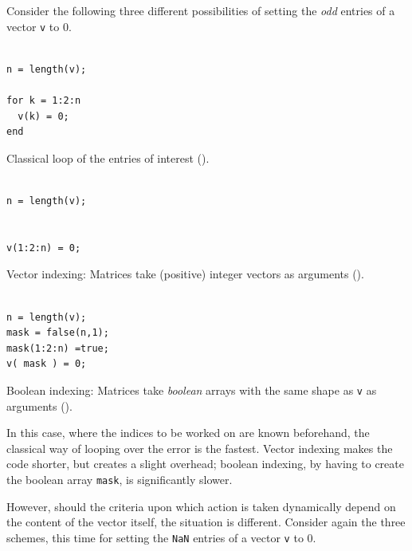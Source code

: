 Consider the following three different possibilities of setting the \emph{odd}
entries of a vector \lstinline!v! to $0$.

\hfill
\begin{minipage}[t]{.29\textwidth}
\begin{lstlisting}[framerule=1pt,rulecolor=\color{goodgreen}]
% [...] create v

n = length(v);

for k = 1:2:n
  v(k) = 0;
end
\end{lstlisting}
Classical loop of the entries of interest ().
\end{minipage}
\hfill
\begin{minipage}[t]{.29\textwidth}
\begin{lstlisting}[framerule=1pt,rulecolor=\color{mediocre}]
% [...] create v

n = length(v);


v(1:2:n) = 0;

\end{lstlisting}
Vector indexing: Matrices take (positive) integer vectors as arguments
().
\end{minipage}
\hfill
\begin{minipage}[t]{.29\textwidth}
\begin{lstlisting}[framerule=1pt,rulecolor=\color{badred}]
% [...] create v

n = length(v);
mask = false(n,1);
mask(1:2:n) =true;
v( mask ) = 0;

\end{lstlisting}
Boolean indexing: Matrices take \emph{boolean} arrays\footnotemark{} with the
same shape as \lstinline!v! as arguments ().
\end{minipage}
\hfill
{}

In this case, where the indices to be worked on are known beforehand, the
classical way of looping over the error is the fastest. Vector indexing makes
the code shorter, but creates a slight overhead; boolean indexing, by having to
create the boolean array \lstinline!mask!, is significantly slower.

However, should the criteria upon which action is taken dynamically depend on
the content of the vector itself, the situation is different.  Consider again
the three schemes, this time for setting the \lstinline!NaN! entries of a
vector \lstinline!v! to $0$.

